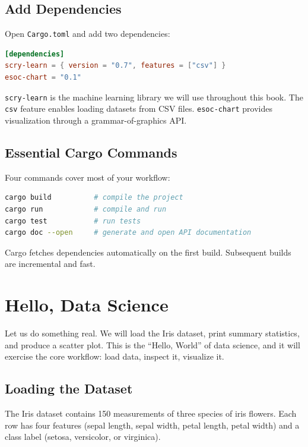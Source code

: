 \subsection{Add Dependencies}

Open \texttt{Cargo.toml} and add two dependencies:

\begin{lstlisting}[language=toml]
[dependencies]
scry-learn = { version = "0.7", features = ["csv"] }
esoc-chart = "0.1"
\end{lstlisting}

\texttt{scry-learn} is the machine learning library we will use throughout this
book. The \texttt{csv} feature enables loading datasets from CSV files.
\texttt{esoc-chart} provides visualization through a grammar-of-graphics API.

\subsection{Essential Cargo Commands}

Four commands cover most of your workflow:

\begin{lstlisting}[language=bash, numbers=none]
cargo build          # compile the project
cargo run            # compile and run
cargo test           # run tests
cargo doc --open     # generate and open API documentation
\end{lstlisting}

Cargo fetches dependencies automatically on the first build. Subsequent builds
are incremental and fast.


\section{Hello, Data Science}
\label{sec:hello-ds}

Let us do something real. We will load the Iris dataset, print summary
statistics, and produce a scatter plot. This is the ``Hello, World'' of data
science, and it will exercise the core workflow: load data, inspect it,
visualize it.

\subsection{Loading the Dataset}

The Iris dataset contains 150 measurements of three species of iris flowers.
Each row has four features (sepal length, sepal width, petal length, petal
width) and a class label (setosa, versicolor, or virginica).

